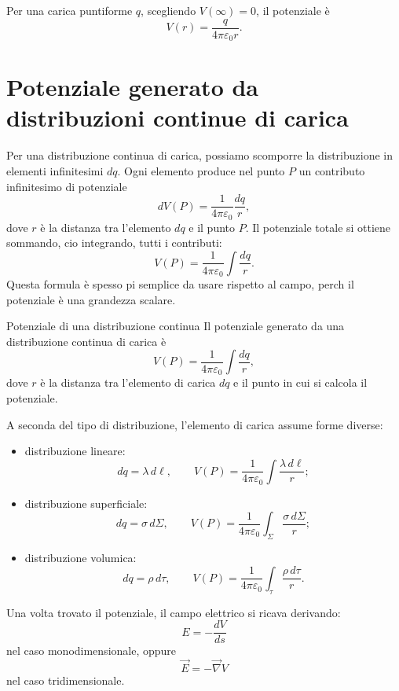 \documentclass[a4paper]{article}
\begin{document}
Per una carica puntiforme \(q\), scegliendo \(V(\infty)=0\), il potenziale è
\[
    V(r)=\frac{q}{4\pi\varepsilon_0r}.
\]

\section{Potenziale generato da distribuzioni continue di carica}

Per una distribuzione continua di carica, possiamo scomporre la distribuzione in elementi infinitesimi \(dq\). Ogni elemento produce nel punto \(P\) un contributo infinitesimo di potenziale
\[
    dV(P)=\frac{1}{4\pi\varepsilon_0}\frac{dq}{r},
\]
dove \(r\) è la distanza tra l'elemento \(dq\) e il punto \(P\). Il potenziale totale si ottiene sommando, cio integrando, tutti i contributi:
\[
    V(P)=\frac{1}{4\pi\varepsilon_0}\int \frac{dq}{r}.
\]
Questa formula è spesso pi semplice da usare rispetto al campo, perch il potenziale è una grandezza scalare.

\begin{snippetproposition}{Potenziale di una distribuzione continua}
    Il potenziale generato da una distribuzione continua di carica è
    \[
        V(P)=\frac{1}{4\pi\varepsilon_0}\int \frac{dq}{r},
    \]
    dove \(r\) è la distanza tra l'elemento di carica \(dq\) e il punto in cui si calcola il potenziale.
\end{snippetproposition}

A seconda del tipo di distribuzione, l'elemento di carica assume forme diverse:
\begin{itemize}
    \item distribuzione lineare:
        \[
            dq=\lambda\,d\ell,
            \qquad
            V(P)=\frac{1}{4\pi\varepsilon_0}\int \frac{\lambda\,d\ell}{r};
        \]
    \item distribuzione superficiale:
        \[
            dq=\sigma\,d\Sigma,
            \qquad
            V(P)=\frac{1}{4\pi\varepsilon_0}\int_\Sigma \frac{\sigma\,d\Sigma}{r};
        \]
    \item distribuzione volumica:
        \[
            dq=\rho\,d\tau,
            \qquad
            V(P)=\frac{1}{4\pi\varepsilon_0}\int_\tau \frac{\rho\,d\tau}{r}.
        \]
\end{itemize}

Una volta trovato il potenziale, il campo elettrico si ricava derivando:
\[
    E=-\frac{dV}{ds}
\]
nel caso monodimensionale, oppure
\[
    \vec{E}=-\vec{\nabla}V
\]
nel caso tridimensionale.
\end{document}
